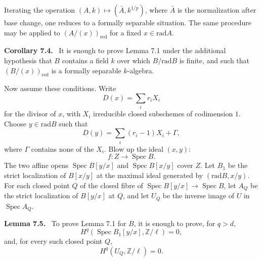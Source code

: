 \documentclass[12pt]{article}
\newcommand{\ZZ}{\mathbb Z}
\DeclareMathOperator{\Spec}{Spec}
\newcommand{\red}{\mathrm{red}}
\newcommand{\rad}{\mathrm{rad}}
\newenvironment{statement}[1]{\par\medskip\noindent\textbf{#1.}\ }{\par\medskip}
\begin{document}
Iterating the operation $(A,k)\mapsto(\bar A,k^{1/p})$, where $\bar A$ is the normalization after base change, one reduces to a formally separable situation. The same procedure may be applied to $(A/(x))_{\red}$ for a fixed $x\in\rad A$.

\begin{statement}{Corollary 7.4}
It is enough to prove Lemma 7.1 under the additional hypothesis that $B$ contains a field $k$ over which $B/\rad B$ is finite, and such that $(B/(x))_{\red}$ is a formally separable $k$-algebra.
\end{statement}

Now assume these conditions. Write
\[
   D(x)=\sum_i r_iX_i
\]
for the divisor of $x$, with $X_i$ irreducible closed subschemes of codimension $1$. Choose $y\in\rad B$ such that
\[
   D(y)=\sum_i(r_i-1)X_i+\Gamma,
\]
where $\Gamma$ contains none of the $X_i$. Blow up the ideal $(x,y)$:
\[
   f:Z\longrightarrow\Spec B.
\]
The two affine opens $\Spec B[y/x]$ and $\Spec B[x/y]$ cover $Z$. Let $B_1$ be the strict localization of $B[x/y]$ at the maximal ideal generated by $(\rad B,x/y)$. For each closed point $Q$ of the closed fibre of $\Spec B[y/x]\to\Spec B$, let $A_Q$ be the strict localization of $B[y/x]$ at $Q$, and let $U_Q$ be the inverse image of $U$ in $\Spec A_Q$.

\begin{statement}{Lemma 7.5}
To prove Lemma 7.1 for $B$, it is enough to prove, for $q>d$,
\begin{equation}
   H^q(\Spec B_1[y/x],\ZZ/\ell)=0, \tag{i}
\end{equation}
and, for every such closed point $Q$,
\begin{equation}
   H^q(U_Q,\ZZ/\ell)=0. \tag{ii}
\end{equation}
\end{statement}
\end{document}

